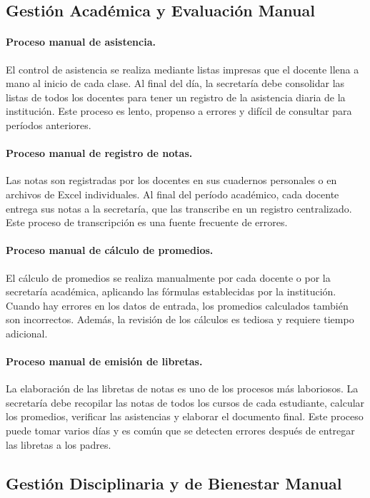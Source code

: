 \documentclass[12pt,a4paper,oneside]{report}
\begin{document}
\subsection{Gestión Académica y Evaluación Manual}

\paragraph{Proceso manual de asistencia.} El control de asistencia se realiza mediante listas impresas que el docente llena a mano al inicio de cada clase. Al final del día, la secretaría debe consolidar las listas de todos los docentes para tener un registro de la asistencia diaria de la institución. Este proceso es lento, propenso a errores y difícil de consultar para períodos anteriores.

\paragraph{Proceso manual de registro de notas.} Las notas son registradas por los docentes en sus cuadernos personales o en archivos de Excel individuales. Al final del período académico, cada docente entrega sus notas a la secretaría, que las transcribe en un registro centralizado. Este proceso de transcripción es una fuente frecuente de errores.

\paragraph{Proceso manual de cálculo de promedios.} El cálculo de promedios se realiza manualmente por cada docente o por la secretaría académica, aplicando las fórmulas establecidas por la institución. Cuando hay errores en los datos de entrada, los promedios calculados también son incorrectos. Además, la revisión de los cálculos es tediosa y requiere tiempo adicional.

\paragraph{Proceso manual de emisión de libretas.} La elaboración de las libretas de notas es uno de los procesos más laboriosos. La secretaría debe recopilar las notas de todos los cursos de cada estudiante, calcular los promedios, verificar las asistencias y elaborar el documento final. Este proceso puede tomar varios días y es común que se detecten errores después de entregar las libretas a los padres.

\subsection{Gestión Disciplinaria y de Bienestar Manual}
\end{document}
